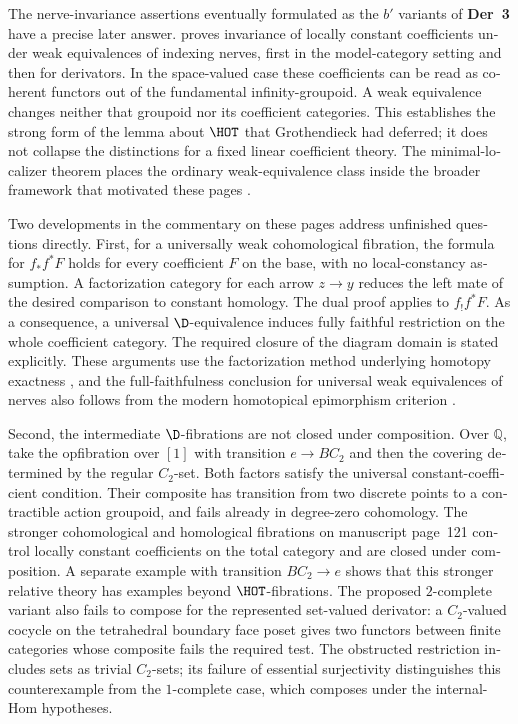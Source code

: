 \begin{otherlanguage}{english}
The nerve-invariance assertions eventually formulated as the $b'$ variants of \textbf{Der~3} have a precise later answer. \citet[Theorem~1.3 and Corollary~3.8]{Cisinski2009LocallyConstant} proves invariance of locally constant coefficients under weak equivalences of indexing nerves, first in the model-category setting and then for derivators. In the space-valued case these coefficients can be read as coherent functors out of the fundamental infinity-groupoid. A weak equivalence changes neither that groupoid nor its coefficient categories. This establishes the strong form of the lemma about $\HOT$ that Grothendieck had deferred; it does not collapse the distinctions for a fixed linear coefficient theory. The minimal-localizer theorem places the ordinary weak-equivalence class inside the broader framework that motivated these pages \citep[Theorem~2.2.11]{Cisinski2004Minimal}.

Two developments in the commentary on these pages address unfinished questions directly. First, for a universally weak cohomological fibration, the formula for $f_*f^*F$ holds for every coefficient $F$ on the base, with no local-constancy assumption. A factorization category for each arrow $z\to y$ reduces the left mate of the desired comparison to constant homology. The dual proof applies to $f_!f^*F$. As a consequence, a universal $\D$-equivalence induces fully faithful restriction on the whole coefficient category. The required closure of the diagram domain is stated explicitly. These arguments use the factorization method underlying homotopy exactness \citep[Theorem~3.8]{GrothPontoShulman2014}, and the full-faithfulness conclusion for universal weak equivalences of nerves also follows from the modern homotopical epimorphism criterion \citep[Theorem~6.10]{GrothStovicek2016Trees}.

Second, the intermediate $\D$-fibrations are not closed under composition. Over $\mathbb Q$, take the opfibration over $[1]$ with transition $e\to BC_2$ and then the covering determined by the regular $C_2$-set. Both factors satisfy the universal constant-coefficient condition. Their composite has transition from two discrete points to a contractible action groupoid, and fails already in degree-zero cohomology. The stronger cohomological and homological fibrations on manuscript page~121 control locally constant coefficients on the total category and are closed under composition. A separate example with transition $BC_2\to e$ shows that this stronger relative theory has examples beyond $\HOT$-fibrations. The proposed $2$-complete variant also fails to compose for the represented set-valued derivator: a $C_2$-valued cocycle on the tetrahedral boundary face poset gives two functors between finite categories whose composite fails the required test. The obstructed restriction includes sets as trivial $C_2$-sets; its failure of essential surjectivity distinguishes this counterexample from the $1$-complete case, which composes under the internal-Hom hypotheses.


\end{otherlanguage}
